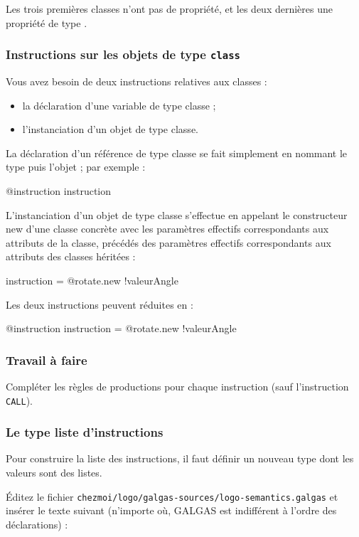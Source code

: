Les trois premières classes n'ont pas de propriété, et les deux dernières une propriété de type .

\subsubsection{Instructions sur les objets de type \texttt{class}}

Vous avez besoin de deux instructions relatives aux classes :
\begin{itemize}
  \item la déclaration d'une variable de type classe ;
  \item l'instanciation d'un objet de type classe.
\end{itemize}

La déclaration d'un référence de type classe se fait simplement en nommant le type puis l'objet ; par exemple :
\begin{galgascode}
@instruction instruction
\end{galgascode}

L'instanciation d'un objet de type classe s'effectue en appelant le constructeur new d'une classe concrète avec les paramètres effectifs correspondants aux attributs de la classe, précédés des paramètres effectifs correspondants aux attributs des classes héritées :
\begin{galgascode}
instruction = @rotate.new {!valeurAngle}
\end{galgascode}

Les deux instructions peuvent réduites en :
\begin{galgascode}
@instruction instruction = @rotate.new {!valeurAngle}
\end{galgascode}

\subsubsection{Travail à faire}
Compléter les règles de productions pour chaque instruction (sauf l'instruction \texttt{CALL}).

\subsubsection{Le type liste d'instructions}
Pour construire la liste des instructions, il faut définir un nouveau type dont les valeurs sont des listes.

Éditez le fichier \texttt{chezmoi/logo/galgas-sources/logo-semantics.galgas} et insérer le texte suivant (n’importe où, GALGAS est indifférent à l’ordre des déclarations) :

